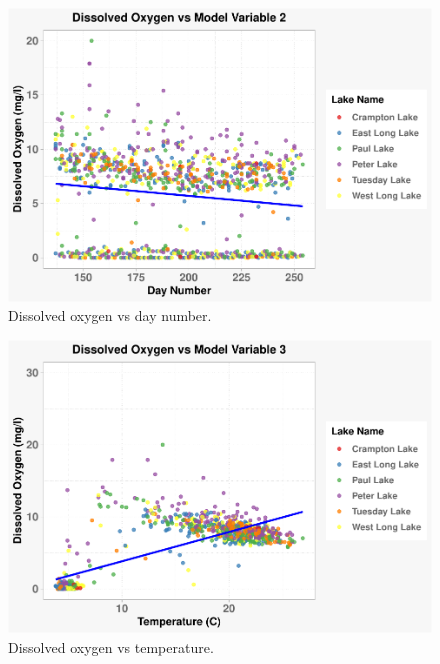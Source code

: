\documentclass[12pt,]{article}
\begin{document}
\begin{figure}
\centering
\includegraphics{Eadala_ENV872_Project_files/figure-latex/fig10-1.pdf}
\caption{Dissolved oxygen vs day number.}
\end{figure}

\begin{figure}
\centering
\includegraphics{Eadala_ENV872_Project_files/figure-latex/fig11-1.pdf}
\caption{Dissolved oxygen vs temperature.}
\end{figure}
\end{document}
